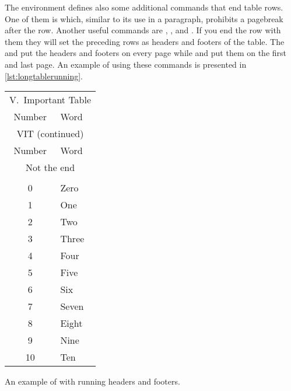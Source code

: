 The  environment defines also some additional commands that end
table rows. One of them is  which, similar to its
use in a paragraph, prohibits a pagebreak after the row. Another useful commands are
, ,  and . If you end
the row with them they will set the preceding rows as headers and footers of
the table. The  and  put the headers and footers on
every page while  and  put them on the first
and last page. An example of using these commands is presented in
\autoref{lst:longtablerunning}.
\begin{listing}
  \begin{example}[
    standalone,
    to_page=2,
    paperwidth=4.3cm,
    paperheight=5cm,
    examplewidth=8.7cm,
    vertical_mode,
  ]
\usepackage{longtable}
\usepackage{booktabs}

\begin{longtable}{cl}
  \toprule
  \multicolumn{2}{c}{V.~Important Table} \\
  Number & Word                           \\
  \midrule \endfirsthead

  \toprule
  \multicolumn{2}{c}{VIT (continued)}    \\
  Number & Word                          \\
  \midrule \endhead

  \midrule
  \multicolumn{2}{c}{Not the end}        \\
  \bottomrule \endfoot

  \midrule
  \multicolumn{2}{c}{The end of VIT}     \\
  \bottomrule \endlastfoot

  0      & Zero   \\
  1      & One    \\
  2      & Two     \\
  3      & Three \\
  4      & Four  \\
  5      & Five  \\
  6      & Six   \\
  7      & Seven \\
  8      & Eight \\
  9      & Nine  \\
  10     & Ten    \\
\end{longtable}
\end{example}
  \caption{An example of  with running headers and
    footers.}\label{lst:longtablerunning}
\end{listing}

